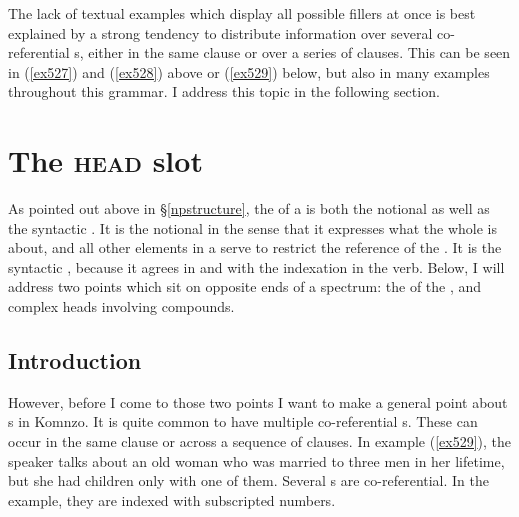 The lack of textual examples which display all possible fillers at once is best explained by a strong tendency to distribute information over several co-referential s, either in the same clause or over a series of clauses. This can be seen in (\ref{ex527}) and (\ref{ex528}) above or (\ref{ex529}) below, but also in many examples throughout this grammar. I address this topic in the following section.

\section{The \textsc{head} slot}\label{headslot}

As pointed out above in \S{}\ref{npstructure}, the  of a  is both the notional  as well as the syntactic . It is the notional  in the sense that it expresses what the whole  is about, and all other elements in a  serve to restrict the reference of the . It is the syntactic , because it agrees in  and  with the indexation in the verb. Below, I will address two points which sit on opposite ends of a spectrum: the  of the , and complex heads involving compounds.

\subsection{Introduction}

However, before I come to those two points I want to make a general point about s in Komnzo. It is quite common to have multiple co-referential s. These can occur in the same clause or across a sequence of clauses. In example (\ref{ex529}), the speaker talks about an old woman who was married to three men in her lifetime, but she had children only with one of them. Several s are co-referential. In the example, they are indexed with subscripted numbers.

